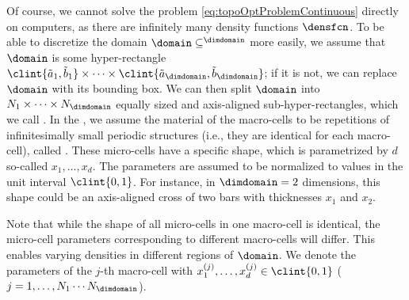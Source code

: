 Of course, we cannot solve the problem \eqref{eq:topoOptProblemContinuous}
directly on computers,
as there are infinitely many density functions $\densfcn$.
To be able to discretize the domain $\domain \subset \real^\dimdomain$
more easily, we assume that $\domain$ is some hyper-rectangle
$\clint{\tilde{a}_1, \tilde{b}_1} \times \dotsb \times
\clint{\tilde{a}_\dimdomain, \tilde{b}_\dimdomain}$;
if it is not, we can replace $\domain$ with its bounding box.
We can then split $\domain$ into $N_1 \times \dotsb \times N_\dimdomain$
equally sized and axis-aligned sub-hyper-rectangles,
which we call .
In the ,
we assume the material of the macro-cells to be
repetitions of infinitesimally small periodic structures
(i.e., they are identical for each macro-cell),
called .
These micro-cells have a specific shape, which is parametrized by $d$ so-called
 $x_1, \dotsc, x_d$.
The parameters are assumed to be normalized to values in the
unit interval $\clint{0, 1}$.
For instance, in $\dimdomain = 2$ dimensions,
this shape could be an axis-aligned cross of two bars
with thicknesses $x_1$ and $x_2$.

Note that while the shape of all micro-cells in one macro-cell is identical,
the micro-cell parameters corresponding to different macro-cells will differ.
This enables varying densities in different regions of $\domain$.
We denote the parameters of the $j$-th macro-cell
with $x_1^{(j)}, \dotsc, x_d^{(j)} \in \clint{0, 1}$
($j = 1, \dotsc, N_1 \dotsm N_\dimdomain$).

\blindtext{}











































